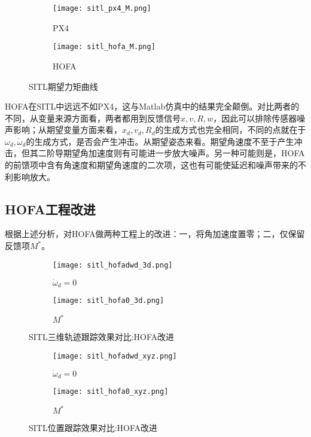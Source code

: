 \begin{figure}[H]
  \centering
\begin{subfigure}[b]{0.49\linewidth}
    \texttt{[image: sitl\_px4\_M.png]}
    \caption{PX4}
\end{subfigure}
\hfill
\begin{subfigure}[b]{0.49\linewidth}
    \texttt{[image: sitl\_hofa\_M.png]}
    \caption{HOFA}
\end{subfigure}
\caption{SITL期望力矩曲线}
\end{figure}

HOFA在SITL中远远不如PX4，这与Matlab仿真中的结果完全颠倒。对比两者的不同，从变量来源方面看，两者都用到反馈信号$x,v,R,w$，因此可以排除传感器噪声影响；从期望变量方面来看，$x_d,v_d,R_d$的生成方式也完全相同，不同的点就在于$\omega_d,\dot \omega_d$的生成方式，是否会产生冲击。从期望姿态来看。期望角速度不至于产生冲击，但其二阶导期望角加速度则有可能进一步放大噪声。另一种可能则是，HOFA的前馈项中含有角速度和期望角速度的二次项，这也有可能使延迟和噪声带来的不利影响放大。



\subsection*{HOFA工程改进}

根据上述分析，对HOFA做两种工程上的改进：一，将角加速度置零；二，仅保留反馈项$M^*$。


\begin{figure}[H]
  \centering
  \begin{subfigure}[b]{0.49\linewidth}
      \texttt{[image: sitl\_hofadwd\_3d.png]}
      \caption{$\dot \omega_d =0$}
  \end{subfigure}
  \hfill %
  \begin{subfigure}[b]{0.49\linewidth}
      \texttt{[image: sitl\_hofa0\_3d.png]}
      \caption{$M^*$}
  \end{subfigure}
  \caption{SITL三维轨迹跟踪效果对比:HOFA改进}
\end{figure}



  \begin{figure}[H]
    \centering
  \begin{subfigure}[b]{0.49\linewidth}
      \texttt{[image: sitl\_hofadwd\_xyz.png]}
      \caption{$\dot \omega_d =0$}
  \end{subfigure}
  \hfill
  \begin{subfigure}[b]{0.49\linewidth}
      \texttt{[image: sitl\_hofa0\_xyz.png]}
      \caption{$M^*$}
  \end{subfigure}
  \caption{SITL位置跟踪效果对比:HOFA改进}
\end{figure}

